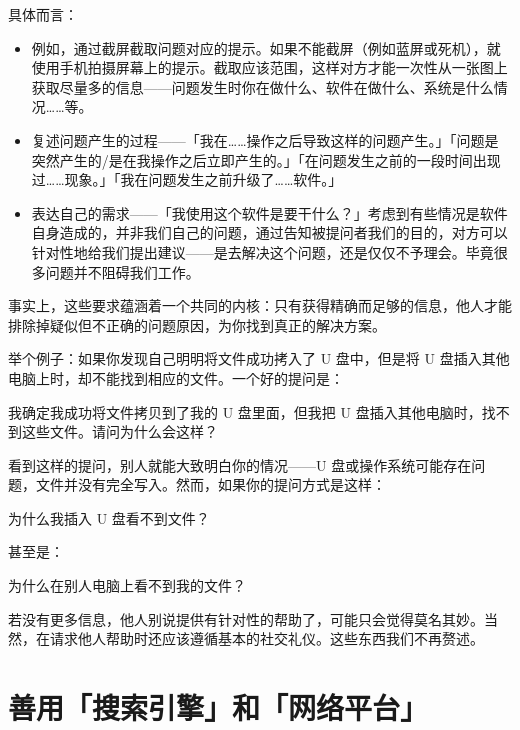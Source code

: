 具体而言：

\begin{itemize}
  \item {}例如，通过截屏截取问题对应的提示。如果不能截屏（例如蓝屏或死机），就使用手机拍摄屏幕上的提示。截取应该范围，这样对方才能一次性从一张图上获取尽量多的信息——问题发生时你在做什么、软件在做什么、系统是什么情况……等。
  \item {}复述问题产生的过程——「我在……操作之后导致这样的问题产生。」「问题是突然产生的/是在我操作之后立即产生的。」「在问题发生之前的一段时间出现过……现象。」「我在问题发生之前升级了……软件。」
  \item {}表达自己的需求——「我使用这个软件是要干什么？」考虑到有些情况是软件自身造成的，并非我们自己的问题，通过告知被提问者我们的目的，对方可以针对性地给我们提出建议——是去解决这个问题，还是仅仅不予理会。毕竟很多问题并不阻碍我们工作。
\end{itemize}

事实上，这些要求蕴涵着一个共同的内核：只有获得精确而足够的信息，他人才能排除掉疑似但不正确的问题原因，为你找到真正的解决方案。

举个例子：如果你发现自己明明将文件成功拷入了 U 盘中，但是将 U 盘插入其他电脑上时，却不能找到相应的文件。一个好的提问是：

\begin{quoting}
  我确定我成功将文件拷贝到了我的 U 盘里面，但我把 U 盘插入其他电脑时，找不到这些文件。请问为什么会这样？
\end{quoting}

看到这样的提问，别人就能大致明白你的情况——U 盘或操作系统可能存在问题，文件并没有完全写入。然而，如果你的提问方式是这样：

\begin{quoting}
  为什么我插入 U 盘看不到文件？
\end{quoting}

甚至是：

\begin{quoting}
  为什么在别人电脑上看不到我的文件？
\end{quoting}

若没有更多信息，他人别说提供有针对性的帮助了，可能只会觉得莫名其妙。当然，在请求他人帮助时还应该遵循基本的社交礼仪。这些东西我们不再赘述。

\section{善用「搜索引擎」和「网络平台」}

